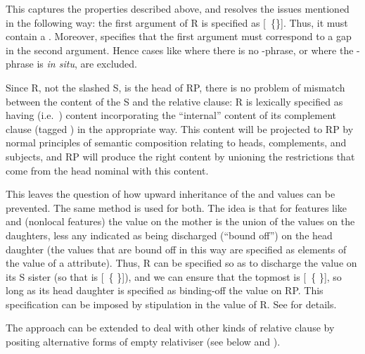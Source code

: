 \documentclass[output=paper
 	        ,biblatex
                ,babelshorthands
                ,newtxmath
                ,draftmode
                ,colorlinks, citecolor=brown
]{langscibook}
\begin{document}
This captures the properties described above, and resolves the issues mentioned in the
following way: the first argument of R is specified as [~\{\}]. Thus, it must contain
a . Moreover,  specifies that the first argument must
correspond to a gap in the second argument. Hence cases like  where there is no
-phrase, or where the -phrase is \emph{in situ}, are excluded.

Since R, not the slashed S, is the head of RP, there is no problem of mismatch between the
content of the S and the relative clause: R is lexically specified as having 
(i.e.\ ) content incorporating the ``internal'' content of its complement clause
(tagged ) in the appropriate way. This  content will be
projected to RP by normal principles of semantic composition relating to heads,
complements, and subjects, and RP will produce the right content by unioning the
restrictions that come from the head nominal with this  content.

This leaves the question of how upward inheritance of the  and 
values can be prevented. The same method is used for both. The idea is that for features
like  and  (nonlocal features) the value on the mother is the
union of the values on the daughters, less any indicated as being discharged
(``bound off'') on the head daughter (the values that are bound off in this way are
specified as elements of the value of a  attribute). Thus, R can be specified so as to discharge the
 value on its S sister (so that  is [~\{ \}]), and we can
ensure that the topmost  is [~\{ \}], so long as its head  daughter is specified as
binding-off the  value on RP. This specification can be imposed by stipulation
in the  value of R.  See  for details.

The approach can be extended to deal with other kinds of relative clause by positing
alternative forms of empty relativiser (see below and \citealt[Chapter~5]{Pollard:Sag:94}).
\end{document}
